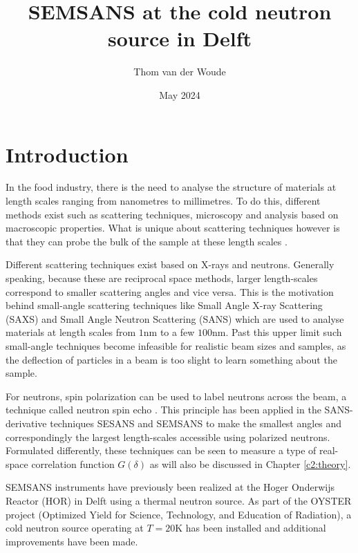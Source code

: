 \documentclass{article}
\title{SEMSANS at the cold neutron source in Delft}
\author{Thom van der Woude}
\date{May 2024}
\begin{document}
\maketitle

\section{Introduction}
In the food industry, there is the need to analyse the structure of materials at length scales ranging from nanometres to millimetres. To do this, different methods exist such as scattering techniques, microscopy and analysis based on macroscopic properties. What is unique about scattering techniques however is that they can probe the bulk of the sample at these length scales \cite{bouwman2021}.


Different scattering techniques exist based on X-rays and neutrons. Generally speaking, because these are reciprocal space methods, larger length-scales correspond to smaller scattering angles and vice versa. This is the motivation behind small-angle scattering techniques like Small Angle X-ray Scattering (SAXS) and Small Angle Neutron Scattering (SANS) which are used to analyse materials at length scales from $1 \unit{\nano\meter}$ to a few $100 \unit{\nano\meter}$. Past this upper limit such small-angle techniques become infeasible for realistic beam sizes and samples, as the deflection of particles in a beam is too slight to learn something about the sample.

For neutrons, spin polarization can be used to label neutrons across the beam, a technique called neutron spin echo \cite{mezei1972}. This principle has been applied in the SANS-derivative techniques SESANS \cite{rekveldt1996} and SEMSANS\cite{bouwman2009}\cite{bouwman2011} to make the smallest angles and correspondingly the largest length-scales accessible using polarized neutrons. Formulated differently, these techniques can be seen to measure a type of real-space correlation function $G(\delta)$\cite{krouglov2003}\cite{andersson2008} as will also be discussed in Chapter \ref{c2:theory}.

SEMSANS instruments have previously been realized at the Hoger Onderwijs Reactor (HOR) in Delft using a thermal neutron source. As part of the OYSTER project (Optimized Yield for Science, Technology, and Education of Radiation), a cold neutron source operating at $T=20 \unit{\kelvin}$ has been installed and additional improvements have been made.
\end{document}
